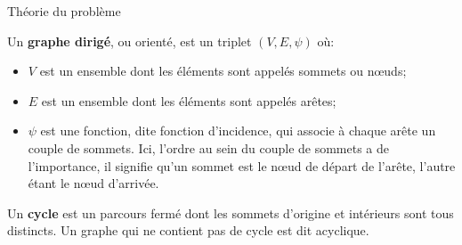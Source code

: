\begin{frame}[allowframebreaks]{Théorie du problème}

Un \textbf{graphe dirigé}, ou orienté, est un triplet $(V,E,\psi)$ où:
\begin{itemize}
\item $V$ est un ensemble dont les éléments sont appelés sommets ou nœuds;
\item $E$ est un ensemble dont les éléments sont appelés arêtes;
\item $\psi$ est une fonction, dite fonction d'incidence, qui associe à chaque arête un couple de sommets. Ici, l'ordre au sein du couple de sommets a de l'importance, il signifie qu'un sommet est le nœud de départ de l'arête, l'autre étant le nœud d'arrivée.\\
\end{itemize}



\hspace{0.5cm}

Un \textbf{cycle} est un parcours fermé dont les sommets d'origine et intérieurs sont tous distincts. Un graphe qui ne contient pas de cycle est dit acyclique.

\end{frame}

